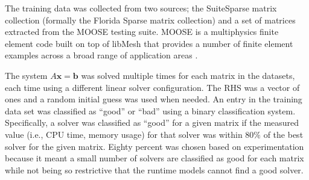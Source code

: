 

The training data was collected from two sources; the SuiteSparse matrix collection (formally the Florida Sparse matrix collection) and a set of matrices extracted from the MOOSE testing suite. MOOSE is a multiphysics finite element code built on top of libMesh that provides a number of finite element examples across a broad range of application areas \cite{MOOSE}. 

The system $A\mathbf{x} = \mathbf{b}$ was solved multiple times for each matrix in the datasets, each time using a different linear solver configuration. The RHS was a vector of ones and a random initial guess was used when needed. An entry in the training data set was classified as ``good'' or ``bad'' using a binary classification system. Specifically, a solver was classified as ``good'' for a given matrix if the measured value (i.e., CPU time, memory usage) for that solver was within $80\%$ of the best solver for the given matrix. Eighty percent was chosen based on experimentation because it meant a small number of solvers are classified as good for each matrix while not being so restrictive that the runtime models cannot find a good solver. 


